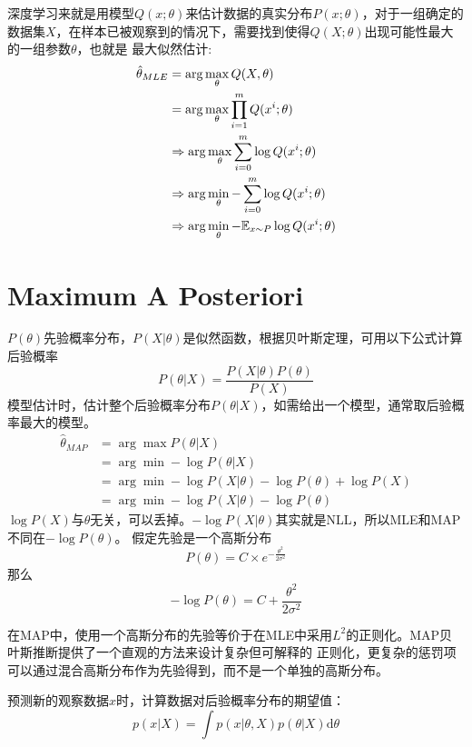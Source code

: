 深度学习来就是用模型$Q(x;\theta)$来估计数据的真实分布$P(x;\theta)$，对于一组确定的数据集$X$，在样本已被观察到的情况下，需要找到使得$Q(X; \theta)$出现可能性最大的一组参数$\theta$，也就是
最大似然估计:
\begin{equation}
    \begin{split}
        \hat{\theta}_{MLE}
        &= \arg \max_\theta Q(X, \theta) \\
        &= \arg \max_{\theta} \prod _{i=1}^m Q(x^i; \theta) \\
        &\Rightarrow \arg \max_{\theta} \sum_{i=0}^m \log Q(x^i; \theta) \\
        &\Rightarrow \arg \min_{\theta} - \sum_{i=0}^m \log Q(x^i; \theta) \\
        &\Rightarrow \arg \min_{\theta} - \mathbb{E} _{x \sim P} \log Q(x^i; \theta)
    \end{split}
\end{equation}


\section{Maximum A Posteriori}
$P(\theta)$先验概率分布，$P(X|\theta)$是似然函数，根据贝叶斯定理，可用以下公式计算后验概率
\begin{equation}
    P(\theta|X) = \frac{P(X|\theta)P(\theta)}{P(X)}
\end{equation}
模型估计时，估计整个后验概率分布$P(\theta|X)$，如需给出一个模型，通常取后验概率最大的模型。
\begin{equation}
    \begin{split}
        \hat{\theta}_{MAP} &= \arg \max P(\theta | X) \\
        &= \arg \min -\log P(\theta | X) \\
        &= \arg \min -\log P(X|\theta) - \log P(\theta) + \log P(X) \\
        &= \arg \min -\log P(X|\theta) - \log P(\theta)
    \end{split}
\end{equation}
$\log P(X)$与$\theta$无关，可以丢掉。$-\log P(X|\theta)$其实就是NLL，所以MLE和MAP不同在$- \log P(\theta)$。
假定先验是一个高斯分布
\begin{equation}
    P(\theta) = C \times e^{-\frac{\theta^2}{2\sigma^2}}
\end{equation}
那么
\begin{equation}
    -\log P(\theta) = C + \frac{\theta^2}{2\sigma^2}
\end{equation}

在MAP中，使用一个高斯分布的先验等价于在MLE中采用$L^2$的正则化。MAP贝叶斯推断提供了一个直观的方法来设计复杂但可解释的
正则化，更复杂的惩罚项可以通过混合高斯分布作为先验得到，而不是一个单独的高斯分布。


预测新的观察数据$x$时，计算数据对后验概率分布的期望值：
\begin{equation}
    p(x|X) = \int p(x | \theta, X)p(\theta|X)\mathrm{d}\theta
\end{equation}
